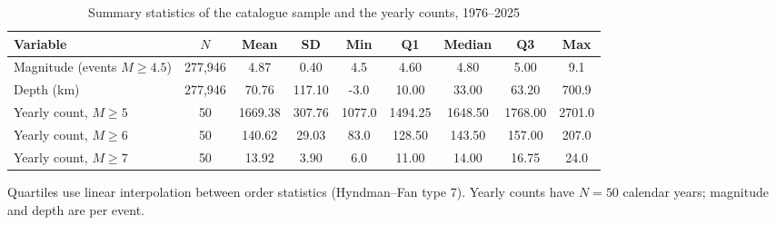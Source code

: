 \begin{table}[t]
\centering
\begin{threeparttable}
\caption{Summary statistics of the catalogue sample and the yearly counts, 1976--2025}
\label{tab:summary}
\begin{tabular}{lcccccccc}
\toprule
Variable & $N$ & Mean & SD & Min & Q1 & Median & Q3 & Max \\
\midrule
Magnitude (events $M\geq 4.5$) & 277,946 & 4.87 & 0.40 & 4.5 & 4.60 & 4.80 & 5.00 & 9.1 \\
Depth (km) & 277,946 & 70.76 & 117.10 & -3.0 & 10.00 & 33.00 & 63.20 & 700.9 \\
Yearly count, $M\geq 5$ & 50 & 1669.38 & 307.76 & 1077.0 & 1494.25 & 1648.50 & 1768.00 & 2701.0 \\
Yearly count, $M\geq 6$ & 50 & 140.62 & 29.03 & 83.0 & 128.50 & 143.50 & 157.00 & 207.0 \\
Yearly count, $M\geq 7$ & 50 & 13.92 & 3.90 & 6.0 & 11.00 & 14.00 & 16.75 & 24.0 \\
\bottomrule
\end{tabular}
\begin{tablenotes}[flushleft]
\footnotesize
\item Quartiles use linear interpolation between order statistics (Hyndman--Fan type 7). Yearly counts have $N=50$ calendar years; magnitude and depth are per event.
\end{tablenotes}
\end{threeparttable}
\end{table}
